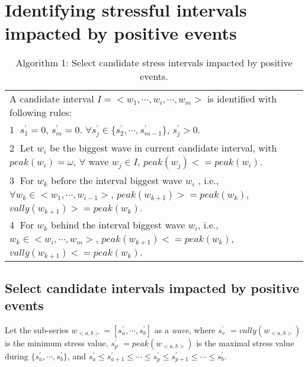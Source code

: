 \appendix
\section{Identifying stressful intervals impacted by positive events}
\begin{table*}
\begin{center}
\caption{\small{Algorithm 1: Select candidate stress intervals impacted by positive events.}}
\begin{tabular}{l} \hline
A candidate interval $I = <w_1,\cdots, w_i,\cdots, w_m>$ is identified with following rules:\\
\textcircled{1} $s^{'}_1 = 0$, $s^{'}_m = 0$. $\forall s^{'}_j \in \{s^{'}_2,\cdots,s^{'}_{m-1}\}$, $s^{'}_j > 0$.\\
\textcircled{2} Let $w_i$ be the biggest wave in current candidate interval, with $peak(w_i) = \omega$, $\forall $ wave $w_j \in I$, $peak(w_j)<=peak(w_i)$.\\
\textcircled{3} For $w_k$ before the interval biggest wave $w_i$ , i.e., $\forall w_k \in <w_1,\cdots,w_{i-1}>$, $peak(w_{k+1})>=peak(w_k)$, $vally(w_{k+1}) >= peak(w_k)$.\\
\textcircled{4} For $w_k$ behind the interval biggest wave $w_i$, i.e.,  $w_k \in <w_{i}, \cdots, w_m>$, $peak(w_{k+1})<=peak(w_k)$, $vally(w_{k+1}) <= peak(w_k)$.\\\hline
\end{tabular}
\end{center}
\end{table*}

\subsection{Select candidate intervals impacted by positive events}
\label{alg:alg1}
Let the sub-series $w_{<a,b>} = [s^{'}_a, \cdots, s^{'}_b]$ as a \emph{wave},
where $s^{'}_v$ $= {vally(w_{<a,b>})}$ is the minimum stress value,
$s^{'}_p$ $= peak(w_{<a,b>})$ is the maximal stress value during $\{s^{'}_a,\cdots,s^{'}_b\}$,
and $s^{'}_a \leq s^{'}_{a+1} \leq \cdots \leq s^{'}_p \leq s^{'}_{p+1} \leq \cdots \leq s^{'}_b$.

